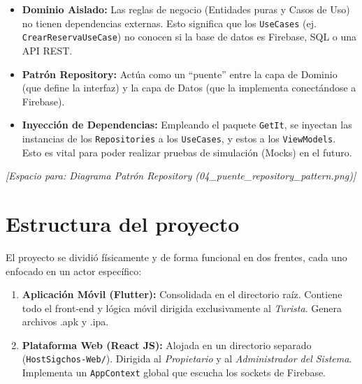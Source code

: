 \documentclass{article}
\begin{document}
\begin{itemize}[label=\small\color{verdeO}$\blacksquare$]
    \item \textbf{Dominio Aislado:} Las reglas de negocio (Entidades puras y Casos de Uso) no tienen dependencias externas. Esto significa que los \texttt{UseCases} (ej. \texttt{CrearReservaUseCase}) no conocen si la base de datos es Firebase, SQL o una API REST.
    \item \textbf{Patrón Repository:} Actúa como un ``puente'' entre la capa de Dominio (que define la interfaz) y la capa de Datos (que la implementa conectándose a Firebase). 
    \item \textbf{Inyección de Dependencias:} Empleando el paquete \texttt{GetIt}, se inyectan las instancias de los \texttt{Repositories} a los \texttt{UseCases}, y estos a los \texttt{ViewModels}. Esto es vital para poder realizar pruebas de simulación (Mocks) en el futuro.
\end{itemize}

\vspace{0.5cm}
\begin{center}
    \textit{[Espacio para: Diagrama Patrón Repository (04\_puente\_repository\_pattern.png)]}
\end{center}

\section{Estructura del proyecto}
El proyecto se dividió físicamente y de forma funcional en dos frentes, cada uno enfocado en un actor específico:

\begin{enumerate}
    \item \textbf{Aplicación Móvil (Flutter):} Consolidada en el directorio raíz. Contiene todo el front-end y lógica móvil dirigida exclusivamente al \textit{Turista}. Genera archivos .apk y .ipa.
    \item \textbf{Plataforma Web (React JS):} Alojada en un directorio separado (\texttt{HostSigchos-Web/}). Dirigida al \textit{Propietario} y al \textit{Administrador del Sistema}. Implementa un \texttt{AppContext} global que escucha los sockets de Firebase.
\end{enumerate}
\end{document}
